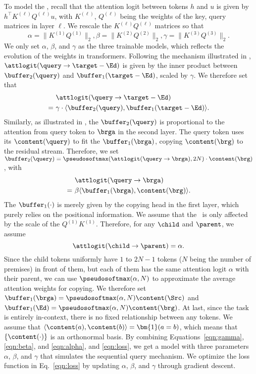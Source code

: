 To model the \attlogit, recall that the attention logit between tokens $h$ and $u$ is given by $h^\top K^{(\ell)}Q^{(\ell)} u$, with $K^{(\ell)}$, $Q^{(\ell)}$ being the weights of the key, query matrices in layer $\ell$. We rescale the $K^{(\ell)}Q^{(\ell)}$ matrices so that 
$$\alpha=\|K^{(1)}Q^{(1)}\|_2, \beta=\|K^{(2)}Q^{(2)}\|_2, \gamma=\|K^{(3)}Q^{(3)}\|_2.$$ 
We only set $\alpha$, $\beta$, and $\gamma$ as the three trainable models, which reflects the evolution of the weights in transformers.
Following the mechanism illustrated in , $\attlogit(\query\to\target-\Ed)$ is given by the inner product between $\buffer_2(\query)$ and $\buffer_1(\target-\Ed)$, scaled by $\gamma$. We therefore set that
\begin{align}
~& \attlogit(\query\to\target-\Ed) \nonumber \nonumber \\
= ~& \gamma \cdot \langle \buffer_2(\query), \buffer_1(\target-\Ed)\rangle.\label{eqn:gamma}
\end{align}
Similarly, as illustrated in , the $\buffer_2(\query)$ is proportional to the attention from query token to $\brga$ in the second layer. The query token uses its $\content(\query)$ to fit the $\buffer_1(\brga)$, copying $\content(\brg)$ to the residual stream. Therefore, we set $\buffer_2(\query)=\pseudosoftmax(\attlogit(\query\to\brga), 2N)\cdot \content(\brg)$, with 
\begin{align} 
 ~& \attlogit(\query\to\brga) \nonumber \\
= ~& \beta \langle \buffer_1(\brga), \content(\brg) \rangle. \label{eqn:beta}
\end{align}
The $\buffer_1(\cdot)$ is merely given by the copying head in the first layer, which purely relies on the positional information. We assume that the \attlogit~is only affected by the scale of the $Q^{(1)}K^{(1)}$. Therefore, for any $\child$ and $\parent$, we assume
\begin{equation}\label{eqn:alpha}
\attlogit(\child\to\parent)=\alpha. 
\end{equation}
Since the child tokens uniformly have $1$ to $2N-1$ tokens ($N$ being the number of premises) in front of them, but each of them has the same attention logit $\alpha$ with their parent, we can use $\pseudosoftmax(\alpha, N)$ to approximate the average attention weights for copying. We therefore set $\buffer_1(\brga)=\pseudosoftmax(\alpha, N)\content(\Src)$ and $\buffer_1(\Ed)=\pseudosoftmax(\alpha, N)\content(\brg)$. At last, since the task is entirely in-context, there is no fixed relationship between any tokens. We assume that $\langle\content(a),\content(b)\rangle = \bm{1}(a=b)$, which means that $\{\content(\cdot)\}$ is an orthonormal basis. By combining Equations~\eqref{eqn:gamma}, \eqref{eqn:beta}, and \eqref{eqn:alpha}, and \eqref{eqn:loss}, we get a model with three parameters $\alpha$, $\beta$, and $\gamma$ that simulates the sequential query mechanism. We optimize the loss function in Eq.~\eqref{eqn:loss} by updating $\alpha$, $\beta$, and $\gamma$ through gradient descent. 

